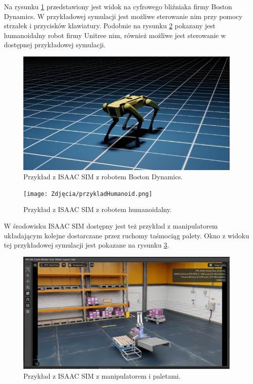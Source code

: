 \documentclass[12pt]{article}
\begin{document}
Na rysunku \ref{fig:bostonDyna} przedstawiony jest widok na cyfrowego bliźniaka firmy Boston Dynamics. W przykładowej symulacji jest możliwe sterowanie nim przy pomocy strzałek i przycisków klawiatury. Podobnie na rysunku \ref{fig:humanoid} pokazany jest humanoidalny robot firmy Unitree nim, również możliwe jest sterowanie w dostępnej przykładowej symulacji.


\begin{figure}[h]
    \centering
    \includegraphics[width=0.8\linewidth]{Zdjęcia/przykladBoston.png}
    \caption{Przykład z ISAAC SIM z robotem Boston Dynamics.}
    \label{fig:bostonDyna}
\end{figure}

\begin{figure}[h]
    \centering
    \texttt{[image: Zdjęcia/przykladHumanoid.png]}
    \caption{Przykład z ISAAC SIM z robotem humanoidalny.}
    \label{fig:humanoid}
\end{figure}

W środowisku ISAAC SIM dostępny jest też przykład z manipulatorem układającym kolejne dostarczane przez ruchomy taśmociąg palety. Okno z widoku tej przykładowej symulacji jest pokazane na rysunku \ref{fig:palety}.

\begin{figure}[h]
    \centering
    \includegraphics[width=0.7\linewidth]{Zdjęcia/przykladowaPaletyzacja.png}
    \caption{Przykład z ISAAC SIM z manipulatorem i paletami.}
    \label{fig:palety}
\end{figure}
\end{document}
